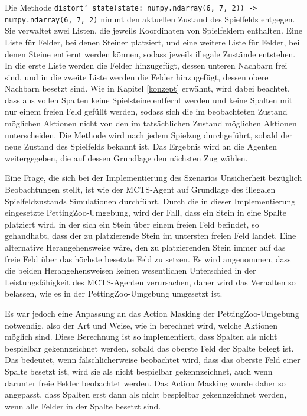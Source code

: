 	Die Methode \texttt{distort\char`_state(state: numpy.ndarray(6, 7, 2)) -> numpy.ndarray(6, 7, 2)} nimmt den aktuellen Zustand des Spielfelds entgegen. Sie verwaltet zwei Listen, die jeweils Koordinaten von Spielfeldern enthalten. Eine Liste für Felder, bei denen Steiner platziert, und eine weitere Liste für Felder, bei denen Steine entfernt werden können, sodass jeweils illegale Zustände entstehen. In die erste Liste werden die Felder hinzugefügt, dessen unteren Nachbarn frei sind, und in die zweite Liste werden die Felder hinzugefügt, dessen obere Nachbarn besetzt sind. Wie in Kapitel \ref{konzept} erwähnt, wird dabei beachtet, dass aus vollen Spalten keine Spielsteine entfernt werden und keine Spalten mit nur einem freien Feld gefüllt werden, sodass sich die im beobachteten Zustand möglichen Aktionen nicht von den im tatsächlichen Zustand möglichen Aktionen unterscheiden. Die Methode wird nach jedem Spielzug durchgeführt, sobald der neue Zustand des Spielfelds bekannt ist. Das Ergebnis wird an die Agenten weitergegeben, die auf dessen Grundlage den nächsten Zug wählen.

\endgroup

Eine Frage, die sich bei der Implementierung des Szenarios Unsicherheit bezüglich Beobachtungen stellt, ist wie der MCTS-Agent auf Grundlage des illegalen Spielfeldzustands Simulationen durchführt. Durch die in dieser Implementierung eingesetzte PettingZoo-Umgebung, wird der Fall, dass ein Stein in eine Spalte platziert wird, in der sich ein Stein über einem freien Feld befindet, so gehandhabt, dass der zu platzierende Stein im untersten freien Feld landet. Eine alternative Herangehensweise wäre, den zu platzierenden Stein immer auf das freie Feld über das höchste besetzte Feld zu setzen. Es wird angenommen, dass die beiden Herangehensweisen keinen wesentlichen Unterschied in der Leistungsfähigkeit des MCTS-Agenten verursachen, daher wird das Verhalten so belassen, wie es in der PettingZoo-Umgebung umgesetzt ist.

Es war jedoch eine Anpassung an das Action Masking der PettingZoo-Umgebung notwendig, also der Art und Weise, wie in berechnet wird, welche Aktionen möglich sind. Diese Berechnung ist so implementiert, dass Spalten als nicht bespielbar gekennzeichnet werden, sobald das oberste Feld der Spalte belegt ist. Das bedeutet, wenn fälschlicherweise beobachtet wird, dass das oberste Feld einer Spalte besetzt ist, wird sie als nicht bespielbar gekennzeichnet, auch wenn darunter freie Felder beobachtet werden. Das Action Masking wurde daher so angepasst, dass Spalten erst dann als nicht bespielbar gekennzeichnet werden, wenn alle Felder in der Spalte besetzt sind.
